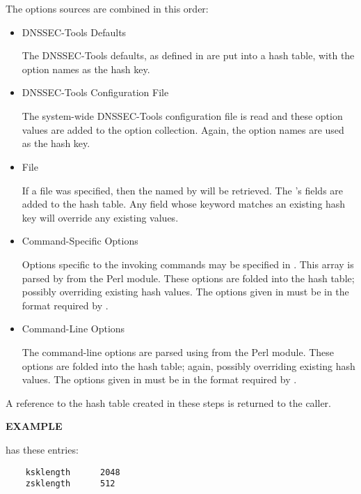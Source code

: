 The options sources are combined in this order:

\begin{itemize}

\item DNSSEC-Tools Defaults\verb" "

The DNSSEC-Tools defaults, as defined in  are put into a hash
table, with the option names as the hash key.

\item DNSSEC-Tools Configuration File\verb" "

The system-wide DNSSEC-Tools configuration file is read and these option
values are added to the option collection.  Again, the option names are used
as the hash key.

\item {} File\verb" "

If a  file was specified, then the  named by
 will be retrieved.  The 's fields are added
to the hash table.  Any field whose keyword matches an existing hash key will
override any existing values.

\item Command-Specific Options\verb" "

Options specific to the invoking commands may be specified in
\var{\@specopts}.  This array is parsed by  from the
 Perl module.  These options are folded into the hash
table; possibly overriding existing hash values.  The options given in
\var{\@specopts} must be in the format required by .

\item Command-Line Options\verb" "

The command-line options are parsed using  from the
 Perl module.  These options are folded into the hash
table; again, possibly overriding existing hash values.  The options given in
\var{\@specopts} must be in the format required by .

\end{itemize}

A reference to the hash table created in these steps is returned to the caller.

{\bf EXAMPLE}

 has these entries:

\begin{verbatim}
    ksklength      2048
    zsklength      512
\end{verbatim}

